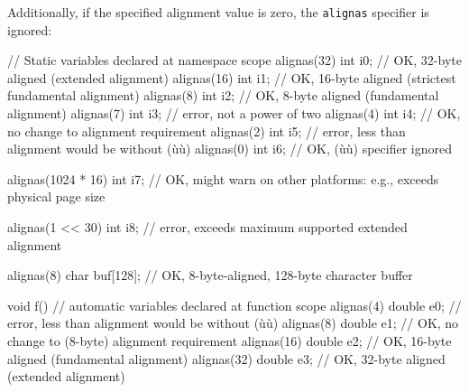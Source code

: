 \noindent Additionally, if the specified alignment value is zero, the
\lstinline!alignas! specifier is ignored:

%
%
%
%
\begin{emcppslisting}
// Static variables declared at namespace scope 
alignas(32) int i0; // OK, 32-byte aligned (extended alignment)
alignas(16) int i1; // OK, 16-byte aligned (strictest fundamental alignment) 
alignas(8)  int i2; // OK,  8-byte aligned (fundamental alignment)
alignas(7)  int i3; // error, not a power of two 
alignas(4)  int i4; // OK, no change to alignment requirement
alignas(2)  int i5; // error, less than alignment would be without (ù{}ù) 
alignas(0)  int i6; // OK, (ù{}ù) specifier ignored 

alignas(1024 * 16) int i7; 
    // OK, might warn on other platforms: e.g., exceeds physical page size

alignas(1 << 30) int i8; 
    // error, exceeds maximum supported extended alignment 

alignas(8) char buf[128]; // OK, 8-byte-aligned, 128-byte character buffer 
    
void f()
{
  // automatic variables declared at function scope
  alignas(4)  double e0; // error, less than alignment would be without (ù{}ù)
  alignas(8)  double e1; // OK, no change to (8-byte) alignment requirement 
  alignas(16) double e2; // OK, 16-byte aligned (fundamental alignment) 
  alignas(32) double e3; // OK, 32-byte aligned (extended alignment)
}
\end{emcppslisting}
    
